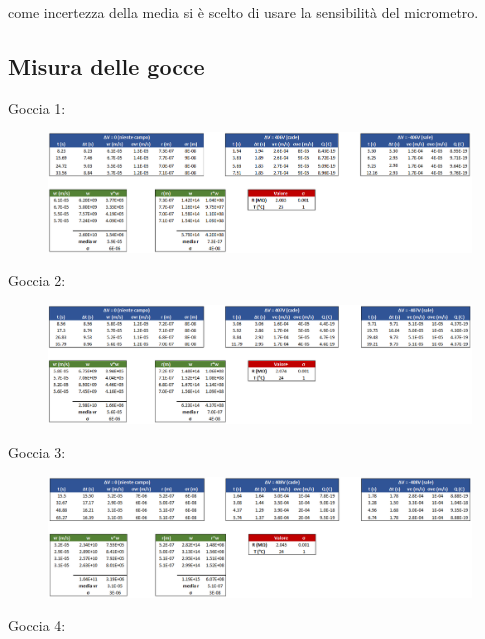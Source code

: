 \documentclass{article}
\begin{document}
come incertezza della media si è scelto di usare la sensibilità del micrometro.

\subsection{Misura delle gocce}

Goccia 1:

\begin{figure}[h]
\centering
\includegraphics[width=\linewidth]{Goccia1}
\end{figure}

\vspace{10mm}

Goccia 2:

\begin{figure}[h]
\centering
\includegraphics[width=\linewidth]{Goccia2}
\end{figure}

\pagebreak

Goccia 3:

\begin{figure}[h]
\centering
\includegraphics[width=\linewidth]{Goccia3}
\end{figure}

\vspace{10mm}

Goccia 4:
\end{document}

